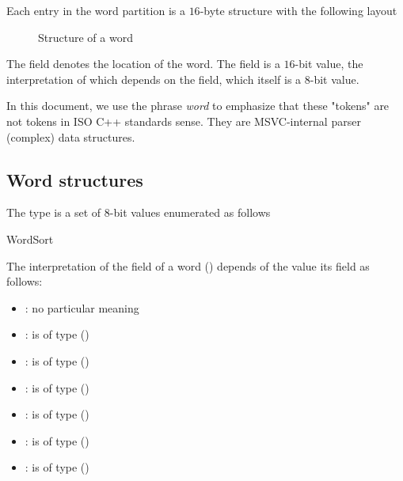 Each entry in the word partition is a $16$-byte structure with the following layout
%
\begin{figure}[H]
	\centering
	\caption{Structure of a word}
	\label{fig:ifc-word-structure}
\end{figure}
%
The  field denotes the location of the word.
The  field is a $16$-bit value, the interpretation of which depends
on the  field, which itself is a $8$-bit value.  

In this document, we use the phrase \emph{word} to emphasize that these "tokens" are not tokens in ISO C++ standards sense.
They are MSVC-internal parser (complex) data structures.


\subsection{Word structures}
\label{sec:ifc:word-structures}

The type  is a set of 8-bit values enumerated as follows
\begin{Enumeration}{WordSort}
\end{Enumeration}

The interpretation of the  field of a 
word ()
depends of the value its  field as follows:
\begin{itemize}
	\item {}: no particular meaning
	\item {}:  is of type
		 ()
	\item {}:  is of type 
	 ()
	\item {}:  is of type
	   ()
	\item {}:  is of type
	    ()
	\item {}:  is of type
		 ()
	\item {}:  is of type
	     ()
\end{itemize}

